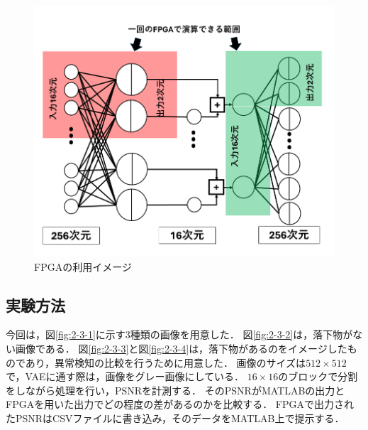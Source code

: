 \documentclass[paper]{ieicej}
\begin{document}
\begin{figure}[tb]
  \begin{center}
    \includegraphics[width=0.98\columnwidth]{figures/SoC_3.png}
  \end{center}
  \caption{FPGAの利用イメージ}
  \label{fig:2-2-4-3}
\end{figure}

\subsection{実験方法}
今回は，図\ref{fig:2-3-1}に示す3種類の画像を用意した．
図\ref{fig:2-3-2}は，落下物がない画像である．
図\ref{fig:2-3-3}と図\ref{fig:2-3-4}は，落下物があるのをイメージしたものであり，異常検知の比較を行うために用意した．
画像のサイズは$512\times512$で，VAEに通す際は，画像をグレー画像にしている．
$16\times16$のブロックで分割をしながら処理を行い，PSNRを計測する．
そのPSNRがMATLABの出力とFPGAを用いた出力でどの程度の差があるのかを比較する．
FPGAで出力されたPSNRはCSVファイルに書き込み，そのデータをMATLAB上で提示する．
\end{document}
